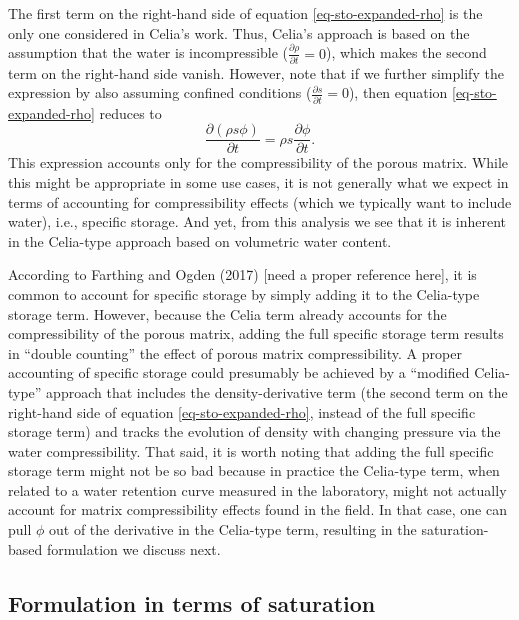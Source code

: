 \documentclass[fleqn]{article}
\begin{document}
{The first term on the right-hand side of equation \ref{eq-sto-expanded-rho} is the only one considered in Celia's work. Thus, Celia's approach is based on the assumption that the water is incompressible ($\frac{\partial \rho}{\partial t} = 0$), which makes the second term on the right-hand side vanish. However, note that if we further simplify the expression by also assuming confined conditions ($\frac{\partial s}{\partial t} = 0$), then equation \ref{eq-sto-expanded-rho} reduces to
\begin{equation}
  \frac{\partial (\rho s \phi)}{\partial t}
  = \rho s \frac{\partial \phi}{\partial t} .
\label{eq-sto-const-rho-s}
\end{equation}
This expression accounts only for the compressibility of the porous matrix. While this might be appropriate in some use cases, it is not generally what we expect in terms of accounting for compressibility effects (which we typically want to include water), i.e., specific storage. And yet, from this analysis we see that it is inherent in the Celia-type approach based on volumetric water content.

According to Farthing and Ogden (2017) [need a proper reference here], it is common to account for specific storage by simply adding it to the Celia-type storage term. However, because the Celia term already accounts for the compressibility of the porous matrix, adding the full specific storage term results in ``double counting'' the effect of porous matrix compressibility.  A proper accounting of specific storage could presumably be achieved by a ``modified Celia-type'' approach that includes the density-derivative term (the second term on the right-hand side of equation \ref{eq-sto-expanded-rho}, instead of the full specific storage term) and tracks the evolution of density with changing pressure via the water compressibility. That said, it is worth noting that adding the full specific storage term might not be so bad because in practice the Celia-type term, when related to a water retention curve measured in the laboratory, might not actually account for matrix compressibility effects found in the field.  In that case, one can pull $\phi$ out of the derivative in the Celia-type term, resulting in the saturation-based formulation we discuss next.

\subsection{Formulation in terms of saturation}

}
\end{document}
